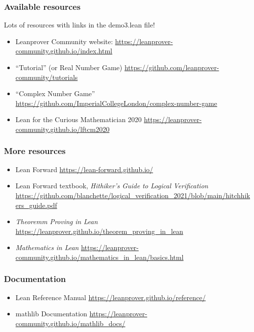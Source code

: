 \documentclass{beamer}
\begin{document}
\begin{frame}
    \frametitle{Available resources}

    Lots of resources with links in the demo3.lean file!
    \begin{itemize}
        \item Leanprover Community website: \url{https://leanprover-community.github.io/index.html}
        \item ``Tutorial'' (or Real Number Game) \url{https://github.com/leanprover-community/tutorials}
        \item ``Complex Number Game'' \url{https://github.com/ImperialCollegeLondon/complex-number-game}
        \item Lean for the Curious Mathematician 2020 \url{https://leanprover-community.github.io/lftcm2020}
    \end{itemize}
\end{frame}

\begin{frame}
    \frametitle{More resources}
    \begin{itemize}
    \item Lean Forward \url{https://lean-forward.github.io/}
    \item Lean Forward textbook, \emph{Hithiker's Guide to Logical Verification} \url{https://github.com/blanchette/logical_verification_2021/blob/main/hitchhikers_guide.pdf}
    \item \emph{Theoremm Proving in Lean} \url{https://leanprover.github.io/theorem_proving_in_lean}
    \item \emph{Mathematics in Lean} \url{https://leanprover-community.github.io/mathematics_in_lean/basics.html}
    \end{itemize}

\end{frame}

\begin{frame}
    \frametitle{Documentation}

    \begin{itemize}
        \item Lean Reference Manual \url{https://leanprover.github.io/reference/}
        \item mathlib Documentation \url{https://leanprover-community.github.io/mathlib_docs/}
    \end{itemize}

\end{frame}
\end{document}
